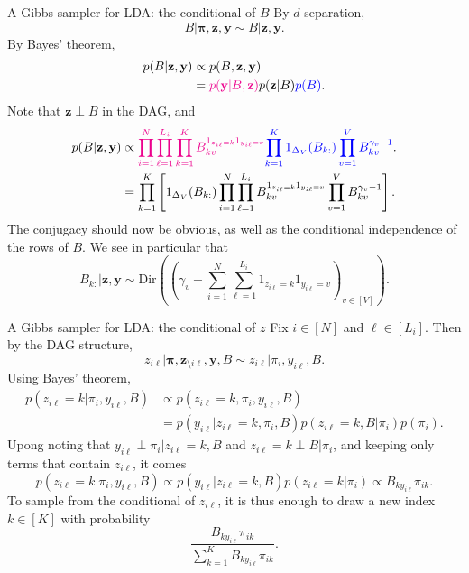 \documentclass[10pt]{beamer}
\renewcommand\un[1]{\textcolor{magenta}{#1}}
\renewcommand\unn[1]{\textcolor{blue}{#1}}
\begin{document}
\begin{frame}{A Gibbs sampler for LDA: the conditional of $B$}
By $d$-separation,
$$
    B \vert \mathbf{\pi}, \mathbf{z}, \mathbf{y} \sim B \vert \mathbf{z}, \mathbf{y}.
$$
By Bayes' theorem,
\begin{align*}
    p(B \vert \mathbf{z}, \mathbf{y}) &\propto p(B, \mathbf{z}, \mathbf{y})\\
    & = \un{p(\mathbf{y} \vert B, \mathbf{z})} p(\mathbf{z}\vert B) \unn{p(B)}.
\end{align*}
Note that $\mathbf{z}\perp B$ in the DAG, and
\begin{align*}
    p(B \vert \mathbf{z}, \mathbf{y})
    &\propto \un{\prod_{i=1}^N \prod_{\ell=1}^{L_i} \prod_{k=1}^K B_{kv}^{1_{z_{i\ell}=k}1_{y_{i\ell}=v}}} \unn{\prod_{k=1}^K 1_{\Delta_V}(B_{k:}) \prod_{v=1}^V B_{kv}^{\gamma_v-1}}.\\
    &= \prod_{k=1}^K\left[ 1_{\Delta_V}(B_{k:}) \prod_{i=1}^N \prod_{\ell=1}^{L_i} B_{kv}^{1_{z_{i\ell}=k}1_{y_{i\ell}=v}} \prod_{v=1}^V B_{kv}^{\gamma_v-1} \right].
\end{align*}
The conjugacy should now be obvious, as well as the conditional independence of the rows of $B$. 
We see in particular that
$$
    B_{k:} \vert \mathbf{z}, \mathbf{y} \sim \mathrm{Dir}\left( (\gamma_v + \sum_{i=1}^N \sum_{\ell=1}^{L_i} 1_{z_{i\ell}=k}1_{y_{i\ell}=v})_{v\in [V]} \right).
$$
\end{frame}

\begin{frame}{A Gibbs sampler for LDA: the conditional of $z$}
Fix $i\in[N]$ and $\ell\in[L_i]$. 
Then by the DAG structure,
$$
    z_{i\ell} \vert \mathbf{\pi}, \mathbf{z}_{\setminus i\ell}, \mathbf{y}, B \sim z_{i\ell} \vert \pi_i, y_{i\ell}, B.
$$
Using Bayes' theorem, 
\begin{align*}
    p(z_{i\ell} = k \vert \pi_i, y_{i\ell}, B) 
    &\propto p(z_{i\ell} = k, \pi_i, y_{i\ell}, B)\\
    &= p(y_{i\ell}\vert z_{i\ell} = k, \pi_i, B) p(z_{i\ell} = k, B\vert\pi_i) p(\pi_i).
\end{align*}
Upong noting that $y_{i\ell}\perp \pi_i\vert z_{i\ell} = k,  B$ and $z_{i\ell} = k \perp B\vert\pi_i$, and keeping only terms that contain $z_{i\ell}$, it comes 
$$
    p(z_{i\ell} = k \vert \pi_i, y_{i\ell}, B) \propto p(y_{i\ell}\vert z_{i\ell} = k, B) p(z_{i\ell} = k \vert\pi_i) \propto B_{k y_{i\ell}} \pi_{ik}.
$$
To sample from the conditional of $z_{i\ell}$, it is thus enough to draw a new index $k\in[K]$ with probability 
$$
    \frac{B_{k y_{i\ell}} \pi_{ik}}{\sum_{k=1}^K B_{k y_{i\ell}} \pi_{ik}}.
$$

\end{frame}
\end{document}
